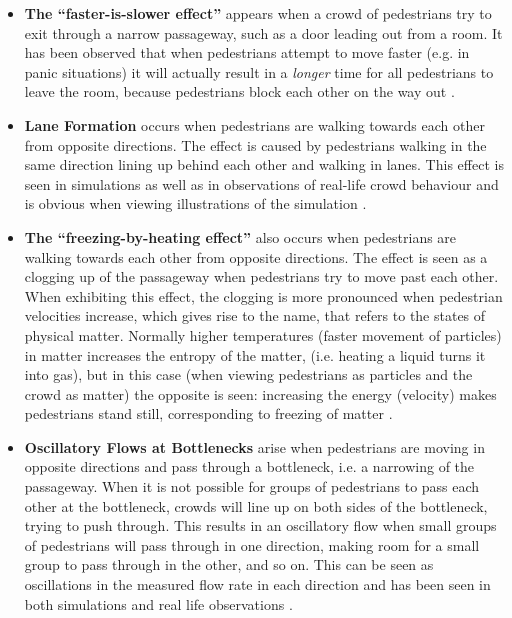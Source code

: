 \begin{itemize}
    \item \textbf{The ``faster-is-slower effect''}  appears when a crowd of 
        pedestrians try to exit through a narrow passageway, such as a door 
        leading out from a room. It has been observed that when pedestrians 
        attempt to move faster (e.g. in panic situations) it will actually 
        result in a \emph{longer} time for all pedestrians to leave the room, 
        because pedestrians block each other on the way out \cite{helbing00}.

    \item \textbf{Lane Formation} occurs when pedestrians are walking towards 
        each other from opposite directions. The effect is caused by 
        pedestrians walking in the same direction lining up behind each other 
        and walking in lanes. This effect is seen in simulations as well as in 
        observations of real-life crowd behaviour and is obvious when viewing 
        illustrations of the simulation \cite{self-org}.
        
    \item \textbf{The ``freezing-by-heating effect''} also occurs when 
        pedestrians are walking towards each other from opposite directions.  
        The effect is seen as a clogging up of the passageway when pedestrians 
        try to move past each other. When exhibiting this effect, the clogging 
        is more pronounced when pedestrian velocities increase, which gives 
        rise to the name, that refers to the states of physical matter.  
        Normally higher temperatures (faster movement of particles) in matter 
        increases the entropy of the matter, (i.e.  heating a liquid turns it 
        into gas), but in this case (when viewing pedestrians as particles and 
        the crowd as matter) the opposite is seen: increasing the energy 
        (velocity) makes pedestrians stand still, corresponding to freezing of 
        matter \cite{frebyheat}.
        
    \item \textbf{Oscillatory Flows at Bottlenecks} arise when pedestrians are 
        moving in opposite directions and pass through a bottleneck, i.e.  a 
        narrowing of the passageway.  When it is not possible for groups of 
        pedestrians to pass each other at the bottleneck, crowds will line up 
        on both sides of the bottleneck, trying to push through. This results 
        in an oscillatory flow when small groups of pedestrians will pass 
        through in one direction, making room for a small group to pass 
        through in the other, and so on.  This can be seen as oscillations in 
        the measured flow rate in each direction and has been seen in both 
        simulations and real life observations \cite{self-org}.
\end{itemize}

